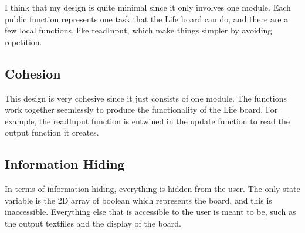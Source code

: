 \documentclass[12pt]{article}
\begin{document}
I think that my design is quite minimal since it only involves one module. Each public function represents one task that the Life board can do, and there are a few local functions, like readInput, which make things simpler by avoiding repetition.

\subsection*{Cohesion}

This design is very cohesive since it just consists of one module. The functions work together seemlessly to produce the functionality of the Life board. For example, the readInput function is entwined in the update function to read the output function it creates. 


\subsection*{Information Hiding}

In terms of information hiding, everything is hidden from the user. The only state variable is the 2D array of boolean which represents the board, and this is inaccessible. Everything else that is accessible to the user is meant to be, such as the output textfiles and the display of the board. 
\end{document}
